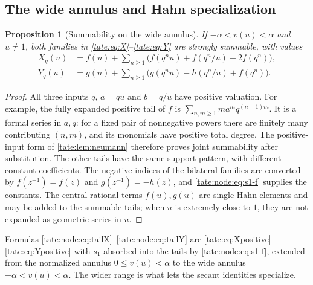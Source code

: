 \documentclass[11pt,letterpaper]{article}
\newtheorem{proposition}[proposition]{Proposition}
\theoremstyle{definition}
\begin{document}
\subsection{The wide annulus and Hahn specialization}

\begin{proposition}[Summability on the wide annulus]\label{tate:node:prop:annulus}
If $-\alpha<v(u)<\alpha$ and $u\ne1$, both families in
\eqref{tate:eq:X}--\eqref{tate:eq:Y} are strongly summable, with values
\begin{align}
 X_q(u)&=f(u)+\sum_{n\ge1}
       \bigl(f(q^nu)+f(q^n/u)-2f(q^n)\bigr),\label{tate:node:eq:tailX}\\
 Y_q(u)&=g(u)+\sum_{n\ge1}
       \bigl(g(q^nu)-h(q^n/u)+f(q^n)\bigr).\label{tate:node:eq:tailY}
\end{align}
\end{proposition}

\begin{proof}
All three inputs $q$, $a=qu$ and $b=q/u$ have positive valuation.
For example, the fully expanded positive tail of $f$ is
$\sum_{n,m\ge1}ma^mq^{(n-1)m}$. It is a formal series in $a,q$: for a
fixed pair of nonnegative powers there are finitely many contributing
$(n,m)$, and its monomials have positive total degree. The
positive-input form of \cref{tate:lem:neumann} therefore proves joint
summability after substitution. The other tails have the same support
pattern, with different constant coefficients. The negative indices of the
bilateral families are converted by $f(z^{-1})=f(z)$ and $g(z^{-1})=-h(z)$,
and \eqref{tate:node:eq:s1-f} supplies the constants. The central rational
terms $f(u),g(u)$ are single Hahn elements and may be added to the summable
tails; when $u$ is extremely close to $1$, they are not expanded as
geometric series in $u$.
\end{proof}

Formulas \eqref{tate:node:eq:tailX}--\eqref{tate:node:eq:tailY} are
\eqref{tate:eq:Xpositive}--\eqref{tate:eq:Ypositive} with $s_1$ absorbed into
the tails by \eqref{tate:node:eq:s1-f}, extended from the normalized
annulus $0\le v(u)<\alpha$ to the wide annulus $-\alpha<v(u)<\alpha$. The
wider range is what lets the secant identities specialize.
\end{document}

